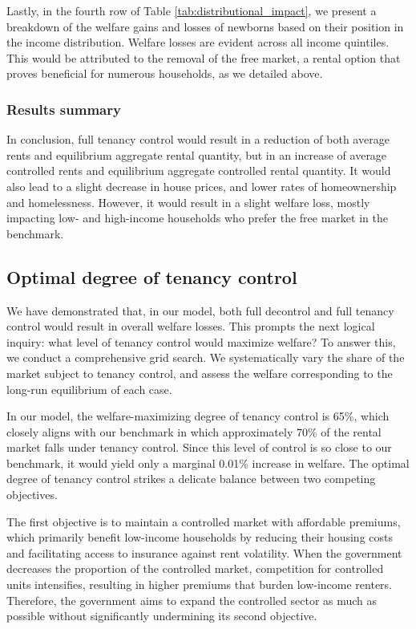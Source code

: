\documentclass[parskip=full]{article}
\begin{document}
Lastly, in the fourth row of Table \ref{tab:distributional_impact}, we present a breakdown of the welfare gains and losses of newborns based on their position in the income distribution. Welfare losses are evident across all income quintiles. This would be attributed to the removal of the free market, a rental option that proves beneficial for numerous households, as we detailed above.

\subsubsection{Results summary}

In conclusion, full tenancy control would result in a reduction of both average rents and equilibrium aggregate rental quantity, but in an increase of average controlled rents and equilibrium aggregate controlled rental quantity. It would also lead to a slight decrease in house prices, and lower rates of homeownership and homelessness. However, it would result in a slight welfare loss, mostly impacting low- and high-income households who prefer the free market in the benchmark. 

\subsection{Optimal degree of tenancy control}\label{subsection:optimal_control}

We have demonstrated that, in our model, both full decontrol and full tenancy control would result in overall welfare losses. This prompts the next logical inquiry: what level of tenancy control would maximize welfare? To answer this, we conduct a comprehensive grid search. We systematically vary the share of the market subject to tenancy control, and assess the welfare corresponding to the long-run equilibrium of each case.

In our model, the welfare-maximizing degree of tenancy control is 65\%, which closely aligns with our benchmark in which approximately 70\% of the rental market falls under tenancy control. Since this level of control is so close to our benchmark, it would yield only a marginal 0.01\% increase in welfare. The optimal degree of tenancy control strikes a delicate balance between two competing objectives.

The first objective is to maintain a controlled market with affordable premiums, which primarily benefit low-income households by reducing their housing costs and facilitating access to insurance against rent volatility. When the government decreases the proportion of the controlled market, competition for controlled units intensifies, resulting in higher premiums that burden low-income renters. Therefore, the government aims to expand the controlled sector as much as possible without significantly undermining its second objective.
\end{document}
